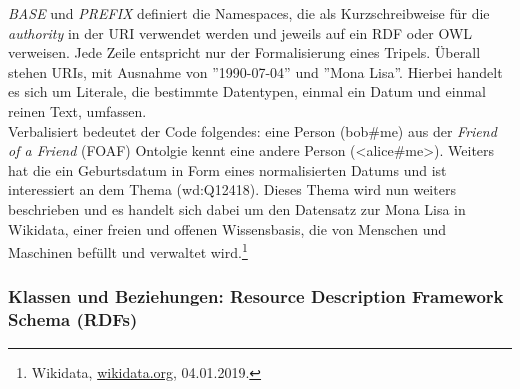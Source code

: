 \documentclass[12pt,a4paper]{article}
\begin{document}
\textit{BASE} und \textit{PREFIX} definiert die Namespaces, die als Kurzschreibweise für die \textit{authority} in der URI verwendet werden und jeweils auf ein RDF oder OWL verweisen. Jede Zeile entspricht nur der Formalisierung eines Tripels. Überall stehen URIs, mit Ausnahme von ''1990-07-04'' und ''Mona Lisa''. Hierbei handelt es sich um Literale, die bestimmte Datentypen, einmal ein Datum und einmal reinen Text, umfassen. 
\\
Verbalisiert bedeutet der Code folgendes: eine Person (bob\#me) aus der \textit{Friend of a Friend} (FOAF) Ontolgie kennt eine andere Person (<alice\#me>). Weiters hat die ein Geburtsdatum in Form eines normalisierten Datums und ist interessiert an dem Thema (wd:Q12418). Dieses Thema wird nun weiters beschrieben und es handelt sich dabei um den Datensatz zur Mona Lisa in Wikidata, einer freien und offenen Wissensbasis, die von Menschen und Maschinen befüllt und verwaltet wird.\footnote{Wikidata, \url{wikidata.org}, 04.01.2019.}
\subsubsection{Klassen und Beziehungen: Resource Description Framework Schema (RDFs)}
\end{document}
